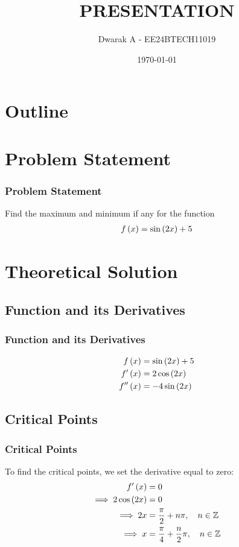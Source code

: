 \documentclass{beamer}
\title{PRESENTATION}
\author{Dwarak A - EE24BTECH11019}
\date{\today}
\numberwithin{equation}{section}
\begin{document}
\begin{frame}
\titlepage
\end{frame}

\section*{Outline}
\begin{frame}
\tableofcontents
\end{frame}

\section{Problem Statement}
\begin{frame}
\frametitle{Problem Statement}
Find the maximum and minimum if any for the function
\begin{align}
    f\left(x\right) = \sin{\ensuremath{\left(2x\right)}}+5 
\end{align}
\end{frame}

\section{Theoretical Solution}
\subsection{Function and its Derivatives}
\begin{frame}
\frametitle{Function and its Derivatives}
\begin{align}
	f\left(x\right) &= \sin{\ensuremath{\left(2x\right)}}+5 \\
	f^\prime\left(x\right) &= 2\cos{\ensuremath{\left(2x\right)}} \\
	f^{\prime\prime}\left(x\right) &= -4\sin{\ensuremath{\left(2x\right)}}
\end{align}
\end{frame}

\subsection{Critical Points}
\begin{frame}
\frametitle{Critical Points}

To find the critical points, we set the derivative equal to zero:
\begin{align}
	f^\prime\left(x\right) &= 0 \\
	\implies 2\cos{\ensuremath{\left(2x\right)}} &= 0 \\
	\implies 2x &= \frac{\pi}{2} + n\pi, \quad n \in \mathbb{Z}\\
	\implies x &= \frac{\pi}{4} + \frac{n}{2}\pi, \quad n \in \mathbb{Z}
\end{align}
\end{frame}
\end{document}
